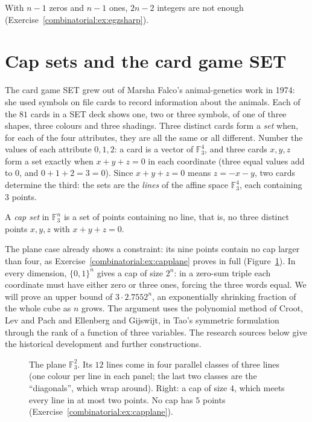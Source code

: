 With $n-1$ zeros and $n-1$ ones, $2n-2$ integers are not enough (Exercise~\ref{combinatorial:ex:egzsharp}).

\section{Cap sets and the card game SET}

The card game SET grew out of Marsha Falco's animal-genetics work in 1974:
she used symbols on file cards to record information about the animals.
Each of the $81$ cards in a SET deck shows one, two or three symbols, of one of three shapes,
three colours and three shadings. Three distinct cards form a \emph{set} when, for each of the four attributes, they are all the same or all different. Number the values of each attribute $0,1,2$: a card is a vector
of $\mathbb F_3^4$, and three cards $x,y,z$ form a set exactly when $x+y+z=0$ in each coordinate (three equal values add to $0$, and $0+1+2=3=0$). Since $x+y+z=0$ means $z=-x-y$, two cards determine the
third: the sets are the \emph{lines} of the affine space $\mathbb F_3^4$, each containing $3$ points.

\begin{definition}\label{combinatorial:def:cap}
A \emph{cap set} in $\mathbb F_3^n$ is a set of points containing no line, that is, no three distinct points $x,y,z$ with $x+y+z=0$.
\end{definition}

The plane case already shows a constraint: its nine points contain no cap
larger than four, as Exercise~\ref{combinatorial:ex:capplane} proves in full
(Figure~\ref{combinatorial:fig:caps}). In every dimension, $\{0,1\}^n$ gives
a cap of size $2^n$: in a zero-sum triple each coordinate must have either
zero or three ones, forcing the three words equal. We will prove an upper
bound of $3\cdot2.7552^n$, an exponentially shrinking fraction of the whole
cube as $n$ grows. The argument uses the polynomial method of Croot, Lev and Pach and
Ellenberg and Gijswijt, in Tao's symmetric formulation through the rank of
a function of three variables. The research sources below give the
historical development and further constructions.

\begin{figure}[ht]
\centering
{}
\caption{The plane $\mathbb F_3^2$. Its $12$ lines come in four parallel classes of three lines (one colour per line in each panel; the last two classes are the ``diagonals'', which wrap around). Right: a cap of
size $4$, which meets every line in at most two points. No cap has $5$ points (Exercise~\ref{combinatorial:ex:capplane}).}
\label{combinatorial:fig:caps}
\end{figure}

